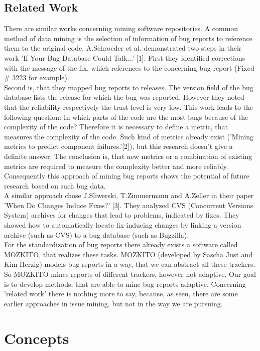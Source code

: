 \section{Related Work}
\label{Related Work}
There are similar works concerning mining software repositories. A common method of data mining is the selection of information of bug reports to reference them to the original code. A.Schroeder et al. demonstrated two steps in their work 'If Your Bug Database Could Talk...' [1]. First they identified corrections with the message of the fix, which references to the concerning bug report (Fixed \# 3223 for example).\\ Second is, that they mapped bug reports to releases. The version field of the bug database lists the release for which the bug was reported. However they noted that the reliability respectively the trust level is very low. This work leads to the following question: In which parts of the code are the most bugs because of the complexity of the code? Therefore it is necessary to define a metric, that measures the complexity of the code. Such kind of metrics already exist ('Mining metrics to predict
component failures.'[2]), but this research doesn't give a definite answer. The conclusion is, that new metrics or a combination of existing metrics are required to measure the complexity better and more reliably. Consequently this approach of mining bug reports shows the potential of future research based on such bug data.\\ A similar approach chose J.Sliwerski, T.Zimmermann and A.Zeller in their paper 'When Do Changes Induce Fixes?' [3]. They analyzed CVS (Concurrent Versions System) archives for changes that lead to problems, indicated by fixes. They showed how to automatically locate fix-inducing changes by linking a version archive (such as CVS) to a bug database (such as Bugzilla).\\ 
For the standardization of bug reports there already exists a software called MOZKITO, that realizes these tasks. MOZKITO (developed by Sascha Just and Kim Herzig) models bug reports in a way, that we can abstract all these trackers. So MOZKITO mines reports of different trackers, however not adaptive. Our goal is to develop methods, that are able to mine bug reports adaptive. Concerning 'related work' there is nothing more to say, because, as seen, there are some earlier approaches in issue mining, but not in the way we are pursuing. 
\chapter{Concepts}
\label{Concepts}

